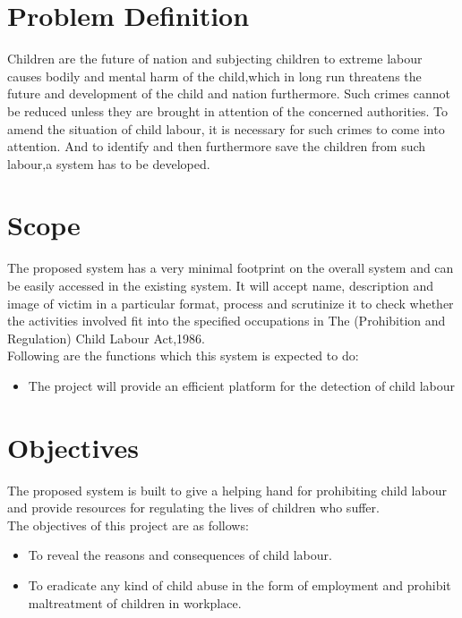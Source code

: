 \section{Problem Definition}
Children are the future of nation and subjecting children to extreme labour causes bodily and mental harm of the child,which in long run threatens the future and development of the child and nation furthermore. Such crimes cannot be reduced unless they are brought in attention of the concerned authorities. To amend the situation of child labour, it is necessary for such crimes to come into attention. And to identify and then furthermore save the children from such labour,a system has to be developed.


\section{Scope}
The proposed system has a very minimal footprint on the overall system and can be easily accessed in the existing system. It will accept name, description and image of victim in a particular format, process and scrutinize it to check whether the activities involved fit into the specified occupations in The (Prohibition and Regulation) Child Labour Act,1986.\\ Following are the functions which this system is expected to do:
\begin{itemize}
\item The project will provide an efficient platform for the detection of child labour
\end{itemize}


\section{Objectives}
The proposed system is built to give a helping hand for prohibiting child labour and provide resources for regulating the lives of children who suffer.\\
The objectives of this project are as follows:
\begin{itemize}
\item To reveal the reasons and consequences of child labour.
\item To eradicate any kind of child abuse in the form of employment and prohibit maltreatment of children in workplace.
\end{itemize}


